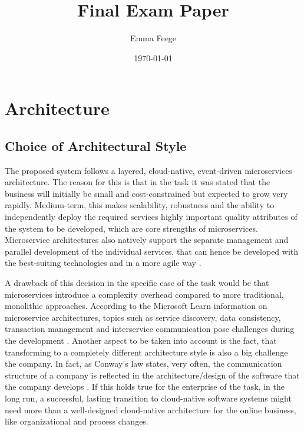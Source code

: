 \documentclass[12pt,a4paper]{article}
\title{Final Exam Paper }
\author{Emma Feege}
\date{\today}
\begin{document}
\maketitle


\tableofcontents
\newpage

\section{Architecture}

\subsection{Choice of Architectural Style}

The proposed system follows a layered, cloud-native, event-driven microservices architecture. The reason for this is that in the task it was stated that the business will initially be small and cost-constrained but expected to grow very rapidly. Medium-term, this makes scalability, robustness and the ability to independently deploy the required services highly important quality attributes of the system to be developed, which are core strengths of microservices. Microservice architectures also natively support the separate management and parallel development of the individual services, that can hence be developed with the best-suiting technologies and in a more agile way \cite{microsoft_learn_microservices}.

A drawback of this decision in the specific case of the task would be that microservices introduce a complexity overhead compared to more traditional, monolithic approaches. According to the Microsoft Learn information on microservice architectures, topics such as service discovery, data consistency, transaction management and interservice communication pose challenges during the development \cite{microsoft_learn_microservices}. Another aspect to be taken into account is the fact, that transforming to a completely different architecture style is also a big challenge the company. In fact, as Conway's law states, very often, the communication structure of a company is reflected in the architecture/design of the software that the company develops \cite{conways_law}. If this holds true for the enterprise of the task, in the long run, a successful, lasting transition to cloud-native software systems might need more than a well-designed cloud-native architecture for the online business, like organizational and process changes.
\end{document}
